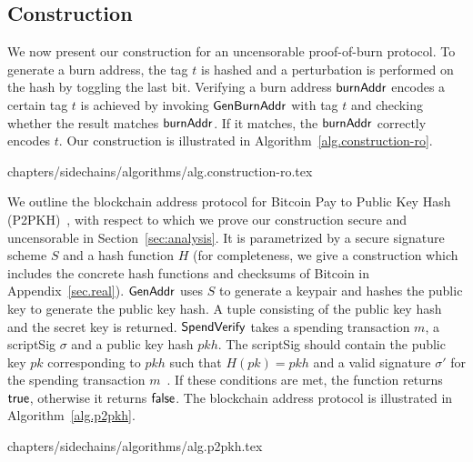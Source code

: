 \subsection{Construction}\label{sec:construction}
We now present our construction for an uncensorable proof-of-burn protocol. To generate a burn address, the tag $t$ is hashed and a perturbation is performed on the hash by toggling the last bit.
Verifying a burn address $\mathsf{burnAddr}$ encodes a certain tag $t$ is achieved by invoking $\mathsf{Gen}\-\mathsf{Burn}\-\mathsf{Addr}$ with tag $t$ and checking whether the result matches $\mathsf{burnAddr}$. If it matches, the $\mathsf{burnAddr}$ correctly encodes $t$. Our construction is illustrated in Algorithm~\ref{alg.construction-ro}.

{chapters/sidechains/algorithms/alg.construction-ro.tex}

We outline the blockchain address protocol for Bitcoin Pay to Public Key Hash (P2PKH)~\cite{bitcoin-dev-guide}, with respect to which we prove our construction secure and uncensorable in Section~\ref{sec:analysis}. It is parametrized by a secure signature scheme $S$ and a hash function $H$ (for completeness, we give a construction which includes the concrete hash
functions and checksums of Bitcoin in Appendix~\ref{sec.real}).
$\mathsf{GenAddr}$ uses $S$ to generate a keypair and hashes the public key to generate the public key hash. A tuple consisting of the public key hash and the secret key is returned.
$\mathsf{SpendVerify}$ takes a spending transaction $m$, a scriptSig $\sigma$ and a public key hash $pkh$. The scriptSig should contain the public key $pk$ corresponding to $pkh$ such that $H(pk) = pkh$ and a valid signature $\sigma'$ for the spending transaction $m$~\cite{bitcoin-dev-guide}. If these conditions are met, the function returns $\textsf{true}$, otherwise it returns $\textsf{false}$.
The blockchain address protocol is illustrated in Algorithm~\ref{alg.p2pkh}.

{chapters/sidechains/algorithms/alg.p2pkh.tex}
